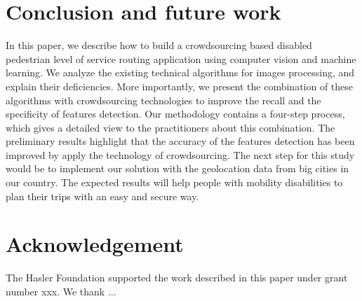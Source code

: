 \documentclass[10pt,conference,a4paper]{IEEEtran}
\begin{document}
\section{Conclusion and future work}

In this paper, we describe how to build a crowdsourcing based disabled pedestrian level of service routing application using computer vision and machine learning. We analyze the existing technical algorithms for images processing, and explain their deficiencies. More importantly, we present the combination of these algorithms with crowdsourcing technologies to improve the recall and the specificity of features detection. Our methodology contains a four-step process, which gives a detailed view to the practitioners about this combination. The preliminary results highlight that the accuracy of the features detection has been improved by apply the technology of crowdsourcing. The next step for this study would be to implement our solution with the geolocation data from big cities in our country. The expected results will help people with mobility disabilities to plan their trips with an easy and secure way.

\section{Acknowledgement}
The Hasler Foundation supported the work described in this paper under grant number xxx. We thank ...





\end{document}
